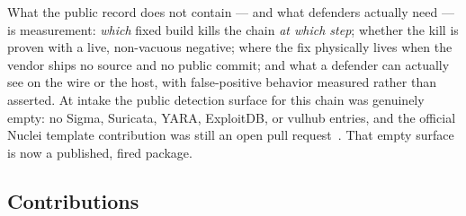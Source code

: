 \documentclass[journal]{IEEEtran}
\begin{document}
What the public record does not contain — and what defenders actually need —
is measurement: \emph{which} fixed build kills the chain \emph{at which step};
whether the kill is proven with a live, non-vacuous negative; where the fix
physically lives when the vendor ships no source and no public commit; and what
a defender can actually see on the wire or the host, with false-positive
behavior measured rather than asserted. At intake the public detection surface
for this chain was genuinely empty: no Sigma, Suricata, YARA, ExploitDB, or
vulhub entries, and the official Nuclei template contribution was still an open
pull request~\cite{facts}. That empty surface is now a published, fired package.

\subsection*{Contributions}
\end{document}
